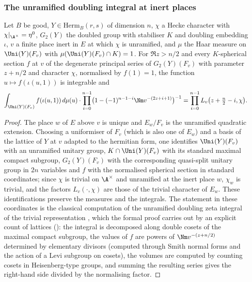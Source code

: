 \subsubsection{The unramified doubling integral at inert places}\label{sec:pf:thmK:dblinert}

\begin{proposition}\label{pf:thmK:dblinert}
Let $B$ be good, $Y\in\mathrm{Herm}_B(r,s)$ of dimension $n$, $\chi$ a Hecke character with $\chi|_{\A^\times}=\eta^0$,
$G_2(Y)$ the doubled group with stabiliser $K$ and doubling embedding $\iota$, $v$ a finite place inert in $E$ at which
$\chi$ is unramified, and $\mu$ the Haar measure on $\Uni(Y)(F_v)$ with $\mu(\Uni(Y)(F_v)\cap K)=1$. For $\Re z>n/2$ and
every $K$-spherical section $f$ at $v$ of the degenerate principal series of $G_2(Y)(F_v)$ with parameter $z+n/2$ and
character $\chi$, normalised by $f(1)=1$, the function $u\mapsto f(\iota(u,1))$ is integrable and
\[
\int_{\Uni(Y)(F_v)}f(\iota(u,1))\,d\mu(u)\cdot\prod_{i=0}^{n-1}\bigl(1-(-1)^{n-1-i}\Nm v^{-(2z+i+1)}\bigr)^{-1}
=\prod_{i=0}^{n-1}L_v\bigl(z+\tfrac n2-i,\chi\bigr).
\]
\end{proposition}

\begin{proof}
The place $w$ of $E$ above $v$ is unique and $E_w/F_v$ is the unramified quadratic extension. Choosing a uniformiser of
$F_v$ (which is also one of $E_w$) and a basis of the lattice of $Y$ at $v$ adapted to the hermitian form, one identifies
$\Uni(Y)(F_v)$ with an unramified unitary group, $K\cap\Uni(Y)(F_v)$ with its standard maximal compact subgroup,
$G_2(Y)(F_v)$ with the corresponding quasi-split unitary group in $2n$ variables and $f$ with the normalised spherical
section in standard coordinates; since $\chi$ is trivial on $\A^\times$ and unramified at the inert place $w$, $\chi_w$ is
trivial, and the factors $L_v(\cdot,\chi)$ are those of the trivial character of $E_w$. These identifications preserve the
measures and the integrals. The statement in these coordinates is the classical computation of the unramified doubling
zeta integral of the trivial representation \cite{GelbartPiatetskiShapiroRallis1987,Li1992}, which the formal proof carries
out by an explicit count of lattices (): the integral
is decomposed along double cosets of the maximal compact subgroup, the values of $f$ are powers of $\Nm v^{-(z+n/2)}$
determined by elementary divisors (computed through Smith normal forms and the action of a Levi subgroup on cosets), the
volumes are computed by counting cosets in Heisenberg-type groups, and summing the resulting series gives the right-hand side
divided by the normalising factor.
\end{proof}

